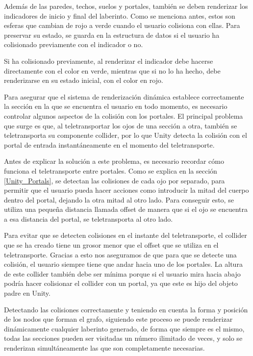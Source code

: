 \documentclass[../main.tex]{subfiles}
\begin{document}
Además de las paredes, techos, suelos y portales, también se deben renderizar los indicadores de inicio y final del laberinto. Como se menciona antes, estos son esferas que cambian de rojo a verde cuando el usuario colisiona con ellas. Para preservar su estado, se guarda en la estructura de datos si el usuario ha colisionado previamente con el indicador o no.

Si ha colisionado previamente, al renderizar el indicador debe hacerse directamente con el color en verde, mientras que si no lo ha hecho, debe renderizarse en su estado inicial, con el color en rojo.

Para asegurar que el sistema de renderización dinámica establece correctamente la sección en la que se encuentra el usuario en todo momento, es necesario controlar algunos aspectos de la colisión con los portales. El principal problema que surge es que, al teletransportar los ojos de una sección a otra, también se teletransporta su componente collider, por lo que Unity detecta la colisión con el portal de entrada instantáneamente en el momento del teletransporte.

Antes de explicar la solución a este problema, es necesario recordar cómo funciona el teletransporte entre portales. Como se explica en la sección \ref{Unity_Portals}, se detectan las colisiones de cada ojo por separado, para permitir que el usuario pueda hacer acciones como introducir la mitad del cuerpo dentro del portal, dejando la otra mitad al otro lado. Para conseguir esto, se utiliza una pequeña distancia llamada offset de manera que si el ojo se encuentra a esa distancia del portal, se teletransporta al otro lado. 

Para evitar que se detecten colisiones en el instante del teletransporte, el collider que se ha creado tiene un grosor menor que el offset que se utiliza en el teletransporte. Gracias a esto nos aseguramos de que para que se detecte una colisión, el usuario siempre tiene que andar hacia uno de los portales. La altura de este collider también debe ser mínima porque si el usuario mira hacia abajo podría hacer colisionar el collider con un portal, ya que este es hijo del objeto padre en Unity.

Detectando las colisiones correctamente y teniendo en cuenta la forma y posición de los nodos que forman el grafo, siguiendo este proceso se puede renderizar dinámicamente cualquier laberinto generado, de forma que siempre es el mismo, todas las secciones pueden ser visitadas un número ilimitado de veces, y solo se renderizan simultáneamente las que son completamente necesarias.
\end{document}
